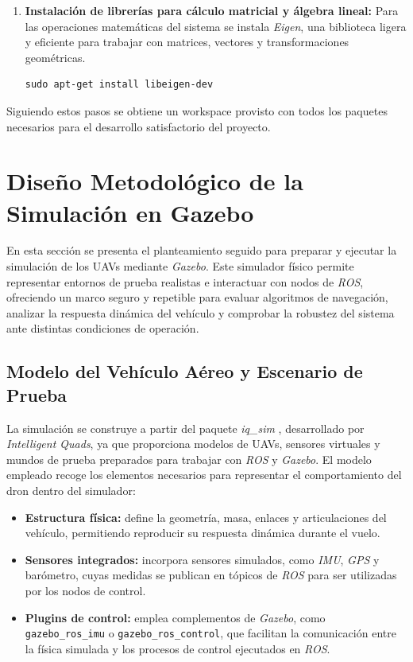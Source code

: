 \begin{enumerate}
\begin{verbatim}
sudo apt-get install ros-noetic-cv-bridge \ 
ros-noetic-vision-opencv libopencv-dev
\end{verbatim}


\item \textbf{Instalación de librerías para cálculo matricial y álgebra lineal:}
Para las operaciones matemáticas del sistema se instala \textit{Eigen}, una biblioteca ligera y eficiente para trabajar con matrices, vectores y transformaciones geométricas.

\begin{verbatim}
sudo apt-get install libeigen-dev
\end{verbatim}

\end{enumerate}


Siguiendo estos pasos se obtiene un workspace provisto con todos los paquetes
necesarios para el desarrollo satisfactorio del proyecto.

\section{Diseño Metodológico de la Simulación en
Gazebo}
En esta sección se presenta el planteamiento seguido para preparar y ejecutar la simulación de los UAVs mediante \textit{Gazebo}. Este simulador físico permite representar entornos de prueba realistas e interactuar con nodos de \textit{ROS}, ofreciendo un marco seguro y repetible para evaluar algoritmos de navegación, analizar la respuesta dinámica del vehículo y comprobar la robustez del sistema ante distintas condiciones de operación.

\subsection{Modelo del Vehículo Aéreo y Escenario de Prueba}
La simulación se construye a partir del paquete \textit{iq\_sim} \cite{iqsim}, desarrollado por \textit{Intelligent Quads}, ya que proporciona modelos de UAVs, sensores virtuales y mundos de prueba preparados para trabajar con \textit{ROS} y \textit{Gazebo}. El modelo empleado recoge los elementos necesarios para representar el comportamiento del dron dentro del simulador:

\begin{itemize}
    \item \textbf{Estructura física:} define la geometría, masa, enlaces y articulaciones del vehículo, permitiendo reproducir su respuesta dinámica durante el vuelo.
    \item \textbf{Sensores integrados:} incorpora sensores simulados, como \textit{IMU}, \textit{GPS} y barómetro, cuyas medidas se publican en tópicos de \textit{ROS} para ser utilizadas por los nodos de control.
    \item \textbf{Plugins de control:} emplea complementos de \textit{Gazebo}, como \texttt{gazebo\_ros\_imu} o \texttt{gazebo\_ros\_control}, que facilitan la comunicación entre la física simulada y los procesos de control ejecutados en \textit{ROS}.
\end{itemize}

